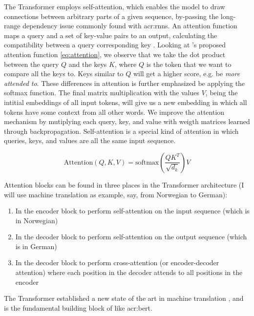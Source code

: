 The Transformer employs self-attention, which enables the model to draw connections between arbitrary parts of a given sequence, by-passing the long-range dependency issue commonly found with \glspl{acr:rnn}. An attention function maps a query and a set of key-value pairs to an output, calculating the compatibility between a query corresponding key \citep[3]{vaswaniAttentionAllYou2017a}. Looking at \citeauthor{vaswaniAttentionAllYou2017a}'s proposed attention function \eqref{eq:attention}, we observe that we take the dot product between the query $Q$ and the keys $K$, where $Q$ is the token that we want to compare all the keys to. Keys similar to $Q$ will get a higher score, e.g. be \textit{more attended to}. These differences in attention is further emphasized be applying the softmax function. The final matrix multiplication with the values $V$, being the intitial embeddings of all input tokens, will give us a new embedding in which all tokens have some context from all other words. We improve the attention mechanism by mutiplying each query, key, and value with weigth matrices learned through backpropagation. Self-attention is a special kind of attention in which queries, keys, and values are all the same input sequence.

\begin{equation}
    \text{Attention}(Q, K, V) = \text{softmax}\left(\frac{QK^T}{\sqrt{d_k}}\right)V
    \label{eq:attention}
\end{equation}

Attention blocks can be found in three places \citep[5]{vaswaniAttentionAllYou2017a} in the Transformer architecture (I will use machine translation as example, say, from Norwegian to German):

\begin{enumerate}
    \item In the encoder block to perform self-attention on the input sequence (which is in Norwegian)
    \item In the decoder block to perform self-attention on the output sequence (which is in German)
    \item In the decoder block to perform cross-attention (or encoder-decoder attention) where each position in the decoder attends to all positions in the encoder
\end{enumerate}

The Transformer established a new state of the art in machine translation \cite{vaswaniAttentionAllYou2017a}, and is the fundamental building block of  like \acrshort{acr:bert}.

